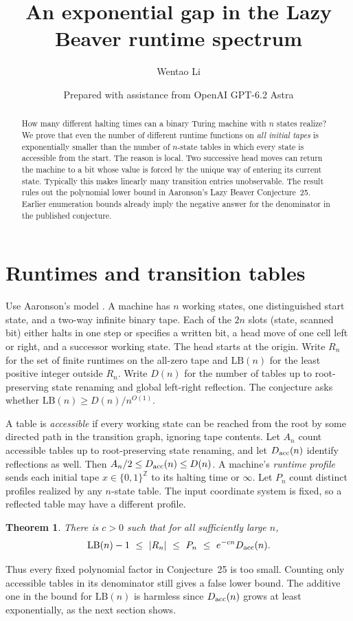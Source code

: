 \documentclass[11pt]{article}
\title{An exponential gap in the Lazy Beaver runtime spectrum}
\author{Wentao Li}
\date{\small Prepared with assistance from OpenAI GPT-6.2 Astra}
\newtheorem{theorem}{Theorem}
\newcommand{\LB}{\mathrm{LB}}
\begin{document}
\maketitle
\begin{abstract}
How many different halting times can a binary Turing machine with $n$ states realize? We prove that even the number of different runtime functions on \emph{all initial tapes} is exponentially smaller than the number of $n$-state tables in which every state is accessible from the start. The reason is local. Two successive head moves can return the machine to a bit whose value is forced by the unique way of entering its current state. Typically this makes linearly many transition entries unobservable. The result rules out the polynomial lower bound in Aaronson's Lazy Beaver Conjecture~25. Earlier enumeration bounds already imply the negative answer for the denominator in the published conjecture.
\end{abstract}

\section{Runtimes and transition tables}
Use Aaronson's model \cite[Sections 1, 5.7 and 5.9]{aaronson}. A machine has $n$ working states, one distinguished start state, and a two-way infinite binary tape. Each of the $2n$ slots (state, scanned bit) either halts in one step or specifies a written bit, a head move of one cell left or right, and a successor working state. The head starts at the origin. Write $R_n$ for the set of finite runtimes on the all-zero tape and $\LB(n)$ for the least positive integer outside $R_n$. Write $D(n)$ for the number of tables up to root-preserving state renaming and global left-right reflection. The conjecture asks whether $\LB(n)\ge D(n)/n^{O(1)}$.

A table is \emph{accessible} if every working state can be reached from the root by some directed path in the transition graph, ignoring tape contents. Let $A_n$ count accessible tables up to root-preserving state renaming, and let $D_{\rm acc}(n)$ identify reflections as well. Then $A_n/2\le D_{\rm acc}(n)\le D(n)$. A machine's \emph{runtime profile} sends each initial tape $x\in\{0,1\}^{\mathbb Z}$ to its halting time or $\infty$. Let $P_n$ count distinct profiles realized by any $n$-state table. The input coordinate system is fixed, so a reflected table may have a different profile.

\begin{theorem}\label{main}
There is $c>0$ such that for all sufficiently large $n$,
\[
    \LB(n)-1\ \le\ |R_n|\ \le\ P_n\ \le\ e^{-cn}D_{\rm acc}(n).
\]
\end{theorem}
Thus every fixed polynomial factor in Conjecture~25 is too small. Counting only accessible tables in its denominator still gives a false lower bound. The additive one in the bound for $\LB(n)$ is harmless since $D_{\rm acc}(n)$ grows at least exponentially, as the next section shows.
\end{document}
